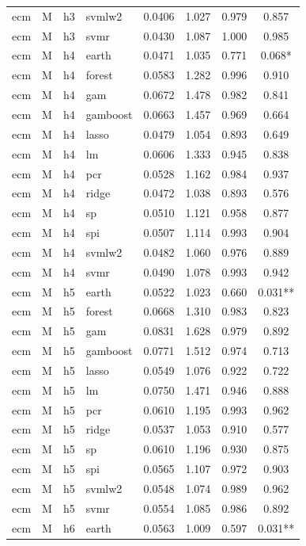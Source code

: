 \begin{ThreePartTable}
\begin{longtable}[t]{llclcccc}
ecm & M & h3 & svmlw2 & 0.0406 & 1.027 & 0.979 & 0.857\\
ecm & M & h3 & svmr & 0.0430 & 1.087 & 1.000 & 0.985\\
\addlinespace
ecm & M & h4 & earth & 0.0471 & 1.035 & 0.771 & 0.068*\\
ecm & M & h4 & forest & 0.0583 & 1.282 & 0.996 & 0.910\\
ecm & M & h4 & gam & 0.0672 & 1.478 & 0.982 & 0.841\\
ecm & M & h4 & gamboost & 0.0663 & 1.457 & 0.969 & 0.664\\
ecm & M & h4 & lasso & 0.0479 & 1.054 & 0.893 & 0.649\\
ecm & M & h4 & lm & 0.0606 & 1.333 & 0.945 & 0.838\\
ecm & M & h4 & pcr & 0.0528 & 1.162 & 0.984 & 0.937\\
ecm & M & h4 & ridge & 0.0472 & 1.038 & 0.893 & 0.576\\
ecm & M & h4 & sp & 0.0510 & 1.121 & 0.958 & 0.877\\
ecm & M & h4 & spi & 0.0507 & 1.114 & 0.993 & 0.904\\
ecm & M & h4 & svmlw2 & 0.0482 & 1.060 & 0.976 & 0.889\\
ecm & M & h4 & svmr & 0.0490 & 1.078 & 0.993 & 0.942\\
\addlinespace
ecm & M & h5 & earth & 0.0522 & 1.023 & 0.660 & 0.031**\\
ecm & M & h5 & forest & 0.0668 & 1.310 & 0.983 & 0.823\\
ecm & M & h5 & gam & 0.0831 & 1.628 & 0.979 & 0.892\\
ecm & M & h5 & gamboost & 0.0771 & 1.512 & 0.974 & 0.713\\
ecm & M & h5 & lasso & 0.0549 & 1.076 & 0.922 & 0.722\\
ecm & M & h5 & lm & 0.0750 & 1.471 & 0.946 & 0.888\\
ecm & M & h5 & pcr & 0.0610 & 1.195 & 0.993 & 0.962\\
ecm & M & h5 & ridge & 0.0537 & 1.053 & 0.910 & 0.577\\
ecm & M & h5 & sp & 0.0610 & 1.196 & 0.930 & 0.875\\
ecm & M & h5 & spi & 0.0565 & 1.107 & 0.972 & 0.903\\
ecm & M & h5 & svmlw2 & 0.0548 & 1.074 & 0.989 & 0.962\\
ecm & M & h5 & svmr & 0.0554 & 1.085 & 0.986 & 0.892\\
\addlinespace
ecm & M & h6 & earth & 0.0563 & 1.009 & 0.597 & 0.031**\\

\end{longtable}
\end{ThreePartTable}
